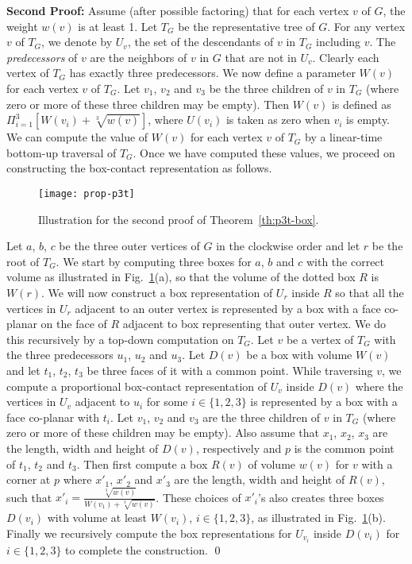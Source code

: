 \documentclass{llncs}
\begin{document}
\noindent
\textbf{Second Proof:}
 Assume (after possible factoring) that for each vertex $v$ of $G$, the weight $w(v)$ is at least
 1. 
Let $T_G$ be the representative tree of $G$. For
 any vertex $v$ of $T_G$, we denote by $U_v$, the set of the descendants of $v$ in $T_G$
 including $v$. The \textit{predecessors} of $v$ are the neighbors of $v$ in $G$ that are not
 in $U_v$. Clearly each vertex of $T_G$ has exactly three predecessors.
We now define a parameter $W(v)$
 for each vertex $v$ of $T_G$. Let $v_1$, $v_2$ and $v_3$ be the three children of $v$ in
 $T_G$ (where zero or more of these three children may be empty). Then $W(v)$ is defined as
 $\Pi_{i=1}^{3}[W(v_i)+\sqrt[3]{w(v)}]$, where $U(v_i)$ is taken as zero when $v_i$ is empty. We
 can compute the value of $W(v)$ for each vertex $v$ of $T_G$ by a linear-time bottom-up
 traversal of $T_G$. Once we have computed these values, we proceed on constructing the
 box-contact representation as follows.


\begin{figure}[htbp]
\centering
\texttt{[image: prop-p3t]}
\caption{Illustration for the second proof of Theorem~\ref{th:p3t-box}.}
\label{fig:prop-p3t}
\end{figure}


Let $a$, $b$, $c$ be the three outer vertices of $G$ in the clockwise order and let $r$ be the
 root of $T_G$. We start by computing three boxes for $a$, $b$ and $c$ with the correct volume
 as illustrated in Fig.~\ref{fig:prop-p3t}(a), so that the volume of the dotted box $R$ is $W(r)$.
 We will now construct a box representation of $U_r$ inside $R$ so that all the vertices in $U_r$
 adjacent to an outer vertex is represented by a box with a face co-planar on the face of $R$
 adjacent to box representing that outer vertex. We do this recursively by a top-down
 computation on $T_G$. Let $v$ be a vertex of $T_G$ with the three predecessors $u_1$, $u_2$
 and $u_3$. Let $D(v)$ be a box with volume $W(v)$ and let $t_1$, $t_2$, $t_3$ be three faces
 of it with a common point. While traversing $v$, we compute a proportional box-contact
 representation of $U_v$ inside $D(v)$ where the vertices in $U_v$ adjacent to $u_i$ for some
 $i\in\{1, 2, 3\}$ is represented by a box with a face co-planar with $t_i$. Let $v_1$, $v_2$ and
 $v_3$ are the three children of $v$ in $T_G$ (where zero or more of these children may be
 empty). Also assume that $x_1$, $x_2$, $x_3$ are the length, width and height of $D(v)$,
 respectively and $p$ is the common point of $t_1$, $t_2$ and $t_3$. Then first compute a
 box $R(v)$ of volume $w(v)$ for $v$ with a corner at $p$ where $x'_1$, $x'_2$ and $x'_3$
 are the length, width and height of $R(v)$, such that
 $x'_i= \frac{\sqrt[3]{w(v)}}{W(v_1)+\sqrt[3]{w(v)}}$.
 These choices of $x'_i$'s also creates three boxes $D(v_i)$ with volume at least $W(v_i)$,
 $i\in\{1, 2, 3\}$, as illustrated in Fig.~\ref{fig:prop-p3t}(b). Finally we recursively compute
 the box representations for $U_{v_i}$ inside $D(v_i)$ for $i\in\{1, 2, 3\}$ to complete
 the construction. \qed
\end{document}
